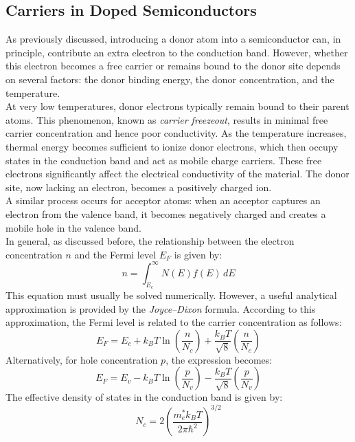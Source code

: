 \subsection{Carriers in Doped Semiconductors}
As previously discussed, introducing a donor atom into a semiconductor can, in principle, contribute an extra electron to the conduction band. However, whether this electron becomes a free carrier or remains bound to the donor site depends on several factors: the donor binding energy, the donor concentration, and the temperature.\\
At very low temperatures, donor electrons typically remain bound to their parent atoms. This phenomenon, known as \textit{carrier freezeout}, results in minimal free carrier concentration and hence poor conductivity. As the temperature increases, thermal energy becomes sufficient to ionize donor electrons, which then occupy states in the conduction band and act as mobile charge carriers. These free electrons significantly affect the electrical conductivity of the material. The donor site, now lacking an electron, becomes a positively charged ion.\\
A similar process occurs for acceptor atoms: when an acceptor captures an electron from the valence band, it becomes negatively charged and creates a mobile hole in the valence band.\\
In general, as discussed before, the relationship between the electron concentration \( n \) and the Fermi level \( E_F \) is given by:
\begin{equation*}
	n = \int_{E_c}^\infty N(E) f(E) \, dE
\end{equation*}
\noindent
This equation must usually be solved numerically. However, a useful analytical approximation is provided by the \textit{Joyce–Dixon} formula. According to this approximation, the Fermi level is related to the carrier concentration as follows:
\begin{equation}
	E_F = E_c + k_B T \ln \left( \frac{n}{N_c} \right) + \frac{k_B T}{\sqrt{8}} \left( \frac{n}{N_c} \right)
\end{equation}
\noindent
Alternatively, for hole concentration \( p \), the expression becomes:
\begin{equation}
	E_F = E_v - k_B T \ln \left( \frac{p}{N_v} \right) - \frac{k_B T}{\sqrt{8}} \left( \frac{p}{N_v} \right)
\end{equation}
\noindent
The effective density of states in the conduction band is given by:
\begin{equation*}
	N_c = 2 \left( \frac{m_e^* k_B T}{2\pi \hbar^2} \right)^{3/2}
\end{equation*}
